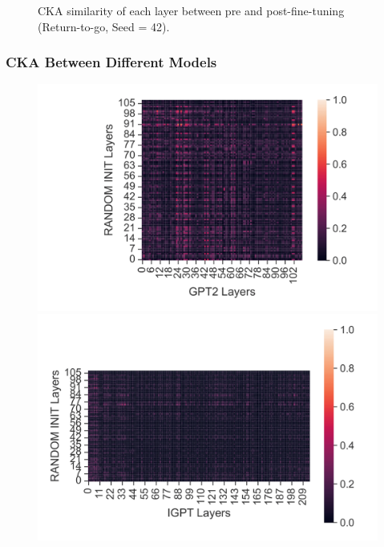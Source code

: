 \documentclass{article}
\begin{document}
\begin{figure}[H]
\begin{minipage}[b]{0.32\linewidth}
    \end{minipage}
    \caption{CKA similarity of each layer between pre and post-fine-tuning (Return-to-go, Seed = 42).}
\end{figure}


\subsubsection{CKA Between Different Models}
\label{appendix:results-for-other-conditions-cka-between-different-models}

\begin{figure}[H]
    \centering
    \begin{minipage}[b]{0.32\linewidth}
        \includegraphics[width=\linewidth]{figs/cka_40_40_dtgpt2_hopper_medium_666_reward.png}
    \end{minipage}
    \begin{minipage}[b]{0.32\linewidth}
        \includegraphics[width=\linewidth]{figs/cka_40_40_dtigpt_hopper_medium_666_reward.png}

\end{minipage}
\end{figure}
\end{document}
